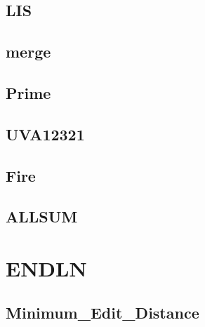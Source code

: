     \subsection{LIS}
        
    \subsection{merge}
          
    \subsection{Prime}
        
    \subsection{UVA12321}
        
    \subsection{Fire}
        
    \subsection{ALLSUM}
        

\section{ENDLN}
    \subsection{Minimum_Edit_Distance}
        
    
